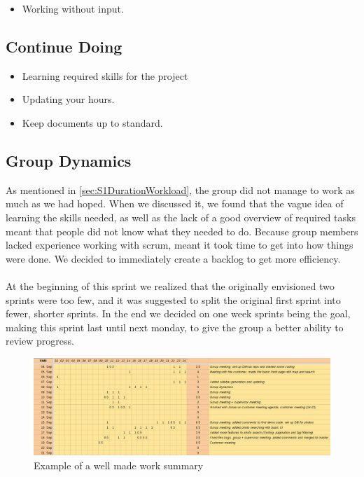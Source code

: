\begin{itemize}
  \item Working without input.
\end{itemize}

\subsection{Continue Doing}
\label{subsec:S1RetrospectiveContinue}

\begin{itemize}
  \item Learning required skills for the project
  \item Updating your hours.
  \item Keep documents up to standard.
\end{itemize}

\subsection{Group Dynamics}
\label{subsec:S1RetrospectiveGroupDynamics}
As mentioned in \ref{sec:S1DurationWorkload}, the group did not manage to work as much as we had hoped. When we discussed it, we found that the vague idea of learning the skills needed, as well as the lack of a good overview of required tasks meant that people did not know what they needed to do. Because group members lacked experience working with scrum, meant it took time to get into how things were done. We decided to immediately create a backlog to get more efficiency.

\paragraph{} At the beginning of this sprint we realized that the originally envisioned two sprints were too few, and it was suggested to split the original first sprint into fewer, shorter sprints. In the end we decided on one week sprints being the goal, making this sprint last until next monday, to give the group a better ability to review progress.

\begin{figure}[ht!]
  \includegraphics[width=\linewidth]{./img/WorkSheetExample}
  \caption{Example of a well made work summary}
\end{figure}


